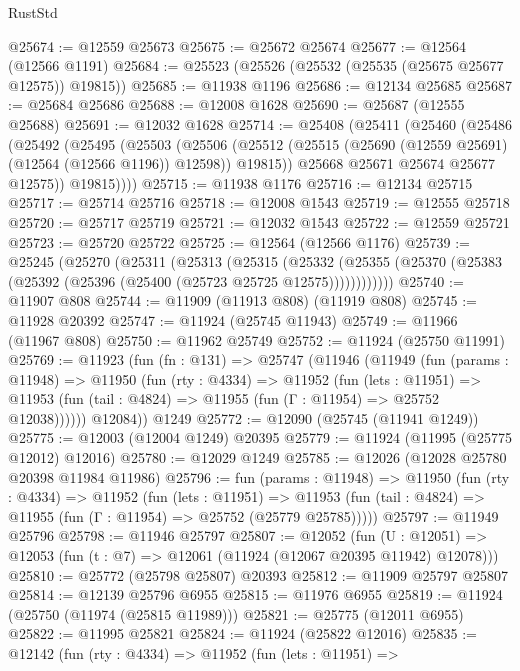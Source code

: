 \begin{lexlean}{RustStd}
\begin{coremodule}
{\begin{coremodule}
{{{{{{{{{{{{{{{{{{{{{{{{{{{{{{{{{{{{{{{{{{{{{{{{{{{{{{{{{{{{{{{{{{{{{{{{{{{{{{{{@25674 := @12559 @25673
@25675 := @25672 @25674
@25677 := @12564 (@12566 @1191)
@25684 := @25523 (@25526 (@25532 (@25535 (@25675 @25677 @12575)) @19815))
@25685 := @11938 @1196
@25686 := @12134 @25685
@25687 := @25684 @25686
@25688 := @12008 @1628
@25690 := @25687 (@12555 @25688)
@25691 := @12032 @1628
@25714 := @25408
    (@25411
      (@25460
        (@25486
          (@25492
            (@25495
              (@25503
                (@25506
                  (@25512 (@25515 (@25690 (@12559 @25691) (@12564 (@12566 @1196)) @12598)) @19815))
                @25668
                @25671
                @25674
                @25677
                @12575))
            @19815))))
@25715 := @11938 @1176
@25716 := @12134 @25715
@25717 := @25714 @25716
@25718 := @12008 @1543
@25719 := @12555 @25718
@25720 := @25717 @25719
@25721 := @12032 @1543
@25722 := @12559 @25721
@25723 := @25720 @25722
@25725 := @12564 (@12566 @1176)
@25739 := @25245
    (@25270
      (@25311
        (@25313
          (@25315
            (@25332
              (@25355 (@25370 (@25383 (@25392 (@25396 (@25400 (@25723 @25725 @12575))))))))))))
@25740 := @11907 @808
@25744 := @11909 (@11913 @808) (@11919 @808)
@25745 := @11928 @20392
@25747 := @11924 (@25745 @11943)
@25749 := @11966 (@11967 @808)
@25750 := @11962 @25749
@25752 := @11924 (@25750 @11991)
@25769 := @11923
    (fun (fn : @131) =>
    @25747
      (@11946
        (@11949
          (fun (params : @11948) =>
          @11950
            (fun (rty : @4334) =>
            @11952
              (fun (lets : @11951) =>
              @11953 (fun (tail : @4824) => @11955 (fun (Γ : @11954) => @25752 @12038))))))
        @12084))
    @1249
@25772 := @12090 (@25745 (@11941 @1249))
@25775 := @12003 (@12004 @1249) @20395
@25779 := @11924 (@11995 (@25775 @12012) @12016)
@25780 := @12029 @1249
@25785 := @12026 (@12028 @25780 @20398 @11984 @11986)
@25796 := fun (params : @11948) =>
  @11950
    (fun (rty : @4334) =>
    @11952
      (fun (lets : @11951) =>
      @11953 (fun (tail : @4824) => @11955 (fun (Γ : @11954) => @25752 (@25779 @25785)))))
@25797 := @11949 @25796
@25798 := @11946 @25797
@25807 := @12052
    (fun (U : @12051) => @12053 (fun (t : @7) => @12061 (@11924 (@12067 @20395 @11942) @12078)))
@25810 := @25772 (@25798 @25807) @20393
@25812 := @11909 @25797 @25807
@25814 := @12139 @25796 @6955
@25815 := @11976 @6955
@25819 := @11924 (@25750 (@11974 (@25815 @11989)))
@25821 := @25775 (@12011 @6955)
@25822 := @11995 @25821
@25824 := @11924 (@25822 @12016)
@25835 := @12142
    (fun (rty : @4334) =>
    @11952
      (fun (lets : @11951) =>
}}}}}}}}}}}}}}}}}}}}}}}}}}}}}}}}}}}}}}}}}}}}}}}}}}}}}}}}}}}}}}}}}}}}}}}}}}}}}}}}
\end{coremodule}}
\end{coremodule}
\end{lexlean}
